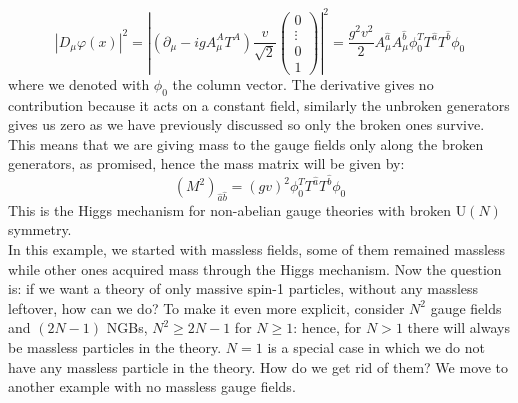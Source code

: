 \documentclass[../main.tex]{subfiles}
\begin{document}
\[
|D_\mu\varphi(x)|^2=\left|(\partial_\mu-igA_\mu^AT^A)\frac{v}{\sqrt{2}}\begin{pmatrix}
    0\\
    \vdots\\
    0\\1
\end{pmatrix}\right|^2=\frac{g^2v^2}{2}A_\mu^{\hat{a}}A_\mu^{\hat{b}}\phi_0^TT^{\hat{a}}T^{\hat{b}}\phi_0
\]
where we denoted with $\phi_0$ the column vector. The derivative gives no contribution because it acts on a constant field, similarly the unbroken generators gives us zero as we have previously discussed so only the broken ones survive. This means that we are giving mass to the gauge fields only along the broken generators, as promised, hence the mass matrix will be given by:
\[
(M^2)_{\hat{a}\hat{b}}=(gv)^2\phi_0^TT^{\hat{a}}T^{\hat{b}}\phi_0
\]
This is the Higgs mechanism for non-abelian gauge theories with broken U$(N)$ symmetry.\\
In this example, we started with massless fields, some of them remained massless while other ones acquired mass through the Higgs mechanism. Now the question is: if we want a theory of only massive spin-1 particles, without any massless leftover, how can we do? To make it even more explicit, consider $N^2$ gauge fields and $(2N-1)$ NGBs, $N^2\ge2N-1$ for $N\ge1$: hence, for $N>1$ there will always be massless particles in the theory. $N=1$ is a special case in which we do not have any massless particle in the theory. How do we get rid of them? We move to another example with no massless gauge fields.
\end{document}
